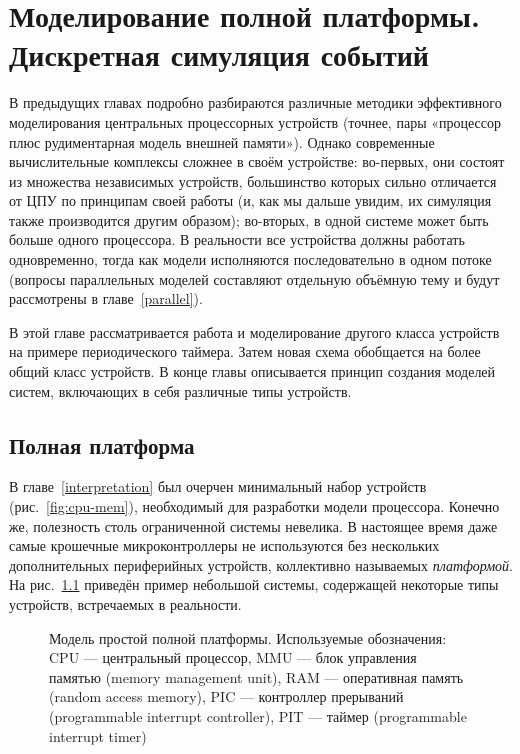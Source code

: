 \chapter[Моделирование полной платформы]{Моделирование полной платформы. Дискретная симуляция событий}\label{fullplatform}


В предыдущих главах подробно разбираются различные методики эффективного моделирования центральных процессорных устройств (точнее, пары «процессор плюс рудиментарная модель внешней памяти»). Однако современные вычислительные комплексы сложнее в своём устройстве: во-первых, они  состоят из множества независимых устройств, большинство которых сильно отличается от ЦПУ по принципам своей работы (и, как мы дальше увидим, их симуляция также производится  другим образом); во-вторых, в одной системе может быть больше одного процессора. В реальности все устройства должны работать одновременно, тогда как модели исполняются последовательно в одном потоке (вопросы параллельных моделей составляют отдельную объёмную тему и будут рассмотрены в главе \ref{parallel}).

В этой главе рассматривается работа и моделирование другого класса устройств на примере периодического таймера. Затем новая схема обобщается на более общий класс устройств. В конце главы описывается принцип создания моделей систем, включающих в себя различные типы устройств.

\section{Полная платформа}

В главе \ref{interpretation} был очерчен минимальный набор устройств (рис. \ref{fig:cpu-mem}), необходимый для разработки модели процессора. Конечно же, полезность столь ограниченной системы невелика. В настоящее время даже самые крошечные микроконтроллеры не используются без нескольких дополнительных периферийных устройств, коллективно называемых \textit{платформой}. На рис. \ref{fig:full-platform} приведён пример небольшой системы, содержащей некоторые типы устройств, встречаемых в реальности.

\begin{figure}[htp]
    \centering
    \caption[Модель простой полной платформы]{Модель простой полной платформы. Используемые обозначения: CPU — центральный процессор, MMU — блок управления памятью (\abbr memory management unit), RAM — оперативная память (\abbr random access memory), PIC — контроллер прерываний (\abbr programmable interrupt controller), PIT — таймер (\abbr programmable interrupt timer)}
    \label{fig:full-platform}
\end{figure}

